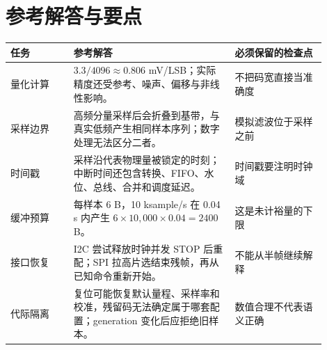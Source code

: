 \section*{参考解答与要点}

\begin{longtable}{L{0.18\linewidth}L{0.46\linewidth}L{0.26\linewidth}}
\toprule
任务 & 参考解答 & 必须保留的检查点 \\
\midrule
量化计算 & $3.3/4096\approx0.806$ mV/LSB；实际精度还受参考、噪声、偏移与非线性影响。 & 不把码宽直接当准确度 \\
采样边界 & 高频分量采样后会折叠到基带，与真实低频产生相同样本序列；数字处理无法区分二者。 & 模拟滤波位于采样之前 \\
时间戳 & 采样沿代表物理量被锁定的时刻；中断时间还包含转换、FIFO、水位、总线、合并和调度延迟。 & 时间戳要注明时钟域 \\
缓冲预算 & 每样本 6 B，10 ksample/s 在 0.04 s 内产生 $6\times10{,}000\times0.04=2400$ B。 & 这是未计裕量的下限 \\
接口恢复 & I2C 尝试释放时钟并发 STOP 后重配；SPI 拉高片选结束残帧，再从已知命令重新开始。 & 不能从半帧继续解释 \\
代际隔离 & 复位可能恢复默认量程、采样率和校准，残留码无法确定属于哪套配置；generation 变化后应拒绝旧样本。 & 数值合理不代表语义正确 \\
\bottomrule
\end{longtable}
